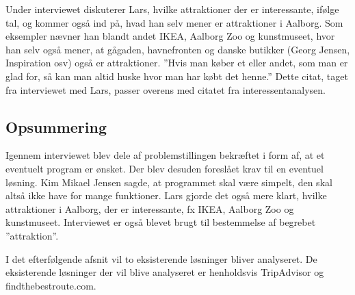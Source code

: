 Under interviewet diskuterer Lars, hvilke attraktioner der er interessante, ifølge tal, og kommer også ind på, hvad han selv mener er attraktioner i Aalborg. Som eksempler nævner han blandt andet IKEA, Aalborg Zoo og kunstmuseet, hvor han selv også mener, at gågaden, havnefronten og danske butikker (Georg Jensen, Inspiration osv) også er attraktioner. ”Hvis man køber et eller andet, som man er glad for, så kan man altid huske hvor man har købt det henne.” Dette citat, taget fra interviewet med Lars, passer overens med citatet fra interessentanalysen.

\subsection{Opsummering}
Igennem interviewet blev dele af problemstillingen bekræftet i form af, at et eventuelt program er ønsket. Der blev desuden foreslået krav til en eventuel løsning. Kim Mikael Jensen sagde, at programmet skal være simpelt, den skal altså ikke have for mange funktioner. Lars gjorde det også mere klart, hvilke attraktioner i Aalborg, der er interessante, fx IKEA, Aalborg Zoo og kunstmuseet. Interviewet er også blevet brugt til bestemmelse af begrebet ”attraktion”. 

I det efterfølgende afsnit vil to eksisterende løsninger bliver analyseret. De eksisterende løsninger der vil blive analyseret er henholdsvis TripAdvisor og findthebestroute.com.
